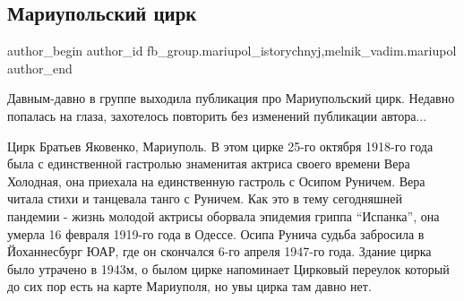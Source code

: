  
 
 
 
 

\subsection{Мариупольский цирк}
\label{sec:06_01_2023.fb.fb_group.mariupol_istorychnyj.1.mariupolskii_tsirk}
 
\ifcmt
 author_begin
   author_id fb_group.mariupol_istorychnyj,melnik_vadim.mariupol
 author_end
\fi

Давным-давно в группе выходила публикация про Мариупольский цирк. Недавно
попалась на глаза, захотелось повторить без изменений публикации автора...

Цирк Братьев Яковенко, Мариуполь. В этом цирке 25-го октября 1918-го года была
с единственной гастролью знаменитая актриса своего времени Вера Холодная, она
приехала на единственную гастроль с Осипом Руничем. Вера читала стихи и
танцевала танго с Руничем. Как это в тему сегодняшней пандемии - жизнь молодой
актрисы оборвала эпидемия гриппа \enquote{Испанка}, она умерла 16 февраля 1919-го года
в Одессе. Осипа Рунича судьба забросила в Йоханнесбург ЮАР, где он скончался
6-го апреля 1947-го года. Здание цирка было утрачено в 1943м, о былом цирке
напоминает Цирковый переулок который до сих пор есть на карте Мариуполя, но увы
цирка там давно нет.

